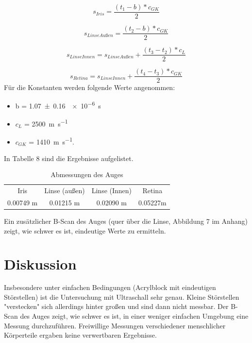 \documentclass[11pt,ngerman,a4paper]{article}
\begin{document}
\begin{equation}
s_{Iris}=\frac{(t_1-b)*c_{GK}}{2}
\end{equation}

\begin{equation}
s_{LinseAußen}=\frac{(t_2-b)*c_{GK}}{2}
\end{equation}

\begin{equation}
s_{LinseInnen}=s_{LinseAußen}+\frac{(t_3-t_2)*c_L}{2}
\end{equation}

\begin{equation}
s_{Retina}=s_{LinseInnen}+\frac{(t_4-t_3)*c_{GK}}{2}
\end{equation}
\newline
Für die Konstanten werden folgende Werte angenommen:
\begin{itemize}
\item b =  \SI[per-mode=symbol]{1.07\pm0.16}{\num{e-6}\second}
\item $c_{L}$ = \SI[per-mode=symbol]{2500}{\metre\per\second}
\item $c_{GK}$ = \SI[per-mode=symbol]{1410}{\metre\per\second}.
\end{itemize}
In Tabelle 8 sind die Ergebnisse aufgelistet.
\begin{table}[h]
\centering
 \begin{tabular}{|c|c|c|c|}
 Iris & Linse (außen) & Linse (Innen) & Retina \\
0.00749 m & 0.01215 m & 0.02090 m & 0.05227m \\
 \end{tabular}
\label{7}
\caption{Abmessungen des Auges}
\end{table}
\newline
Ein zusätzlicher B-Scan des Auges (quer über die Linse, Abbildung 7 im Anhang) zeigt, wie schwer es ist, eindeutige Werte zu ermitteln.

\section{Diskussion}
Insbesondere unter einfachen Bedingungen (Acrylblock mit eindeutigen Störstellen) ist die Untersuchung mit Ultraschall sehr genau. Kleine Störstellen "verstecken" sich allerdings hinter großen und sind dann nicht messbar. Der B-Scan des Auges zeigt, wie schwer es ist, in einer weniger einfachen Umgebung eine Messung durchzuführen. Freiwillige Messungen verschiedener menschlicher Körperteile ergaben keine verwertbaren Ergebnisse.
\end{document}
